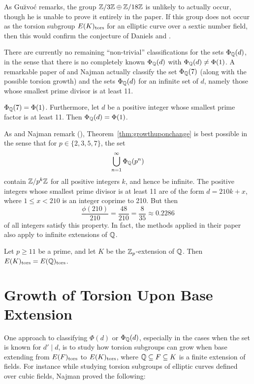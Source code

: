 As Gu\u{z}vo\'c remarks, the group $\mathbb{Z}/3\mathbb{Z} \oplus \mathbb{Z}/18\mathbb{Z}$ is unlikely to actually occur, though he is unable to prove it entirely in the paper. If this group does not occur as the torsion subgroup $E(K)_{\text{tors}}$ for an elliptic curve over a sextic number field, then this would confirm the conjecture of Daniels and \gonjim{}. 


There are currently no remaining ``non-trivial'' classifications for the sets $\Phi_{\mathbb{Q}}(d)$, in the sense that there is no completely known $\Phi_{\mathbb{Q}}(d)$ with $\Phi_{\mathbb{Q}}(d) \neq \Phi(1)$. A remarkable paper of \gonjim{} and Najman actually classify the set $\Phi_{\mathbb{Q}}(7)$ (along with the possible torsion growth) and the sets $\Phi_{\mathbb{Q}}(d)$ for an infinite set of $d$, namely those whose smallest prime divisor is at least 11. 


\begin{thm} \label{thm:growthuponchange}
$\Phi_{\mathbb{Q}}(7)= \Phi(1)$. Furthermore, let $d$ be a positive integer whose smallest prime factor is at least 11. Then $\Phi_{\mathbb{Q}}(d)= \Phi(1)$. 
\end{thm}


As \gonjim{} and Najman remark (\cite[Rem.~7.4]{gonzalezjimeneznajman20base}), Theorem~\ref{thm:growthuponchange} is best possible in the sense that for $p \in \{ 2, 3, 5, 7 \}$, the set
	\[
	\bigcup_{n=1}^\infty \Phi_{\mathbb{Q}}(p^n)
	\]
contain $\mathbb{Z}/p^k\mathbb{Z}$ for all positive integers $k$, and hence be infinite. The positive integers whose smallest prime divisor is at least 11 are of the form $d= 210k + x$, where $1 \leq x < 210$ is an integer coprime to 210. But then 
	\[
	\dfrac{\phi(210)}{210}= \dfrac{48}{210}= \dfrac{8}{35} \approx 0.2286
	\]
of all integers satisfy this property. In fact, the methods applied in their paper also apply to infinite extensions of $\mathbb{Q}$.


\begin{cor}
Let $p \geq 11$ be a prime, and let $K$ be the $\mathbb{Z}_p$-extension of $\mathbb{Q}$. Then $E(K)_{\text{tors}}= E(\mathbb{Q})_{\text{tors}}$. 
\end{cor}





\section{Growth of Torsion Upon Base Extension}

One approach to classifying $\Phi(d)$ or $\Phi_{\mathbb{Q}}(d)$, especially in the cases when the set is known for $d' \mid d$, is to study how torsion subgroups can grow when base extending from $E(F)_{\text{tors}}$ to $E(K)_{\text{tors}}$, where $\mathbb{Q} \subseteq F \subseteq K$ is a finite extension of fields. For instance while studying torsion subgroups of elliptic curves defined over cubic fields, Najman proved the following:


